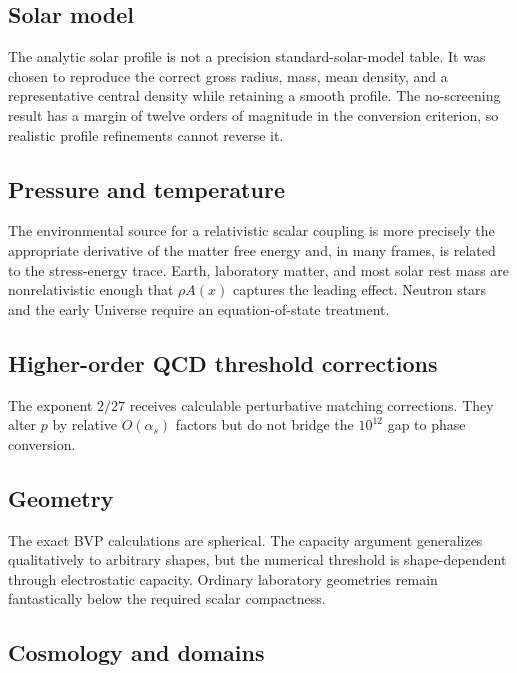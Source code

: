 \documentclass[11pt,a4paper]{article}
\begin{document}
\subsection{Solar model}\label{solar-model}

The analytic solar profile is not a precision standard-solar-model
table. It was chosen to reproduce the correct gross radius, mass, mean
density, and a representative central density while retaining a smooth
profile. The no-screening result has a margin of twelve orders of
magnitude in the conversion criterion, so realistic profile refinements
cannot reverse it.

\subsection{Pressure and
temperature}\label{pressure-and-temperature}

The environmental source for a relativistic scalar coupling is more
precisely the appropriate derivative of the matter free energy and, in
many frames, is related to the stress-energy trace. Earth, laboratory
matter, and most solar rest mass are nonrelativistic enough that
\(\rho A(x)\) captures the leading effect. Neutron stars and the early
Universe require an equation-of-state treatment.

\subsection{Higher-order QCD threshold
corrections}\label{higher-order-qcd-threshold-corrections}

The exponent \(2/27\) receives calculable perturbative matching
corrections. They alter \(p\) by relative \(O(\alpha_s)\) factors but do
not bridge the \(10^{12}\) gap to phase conversion.

\subsection{Geometry}\label{geometry}

The exact BVP calculations are spherical. The capacity argument
generalizes qualitatively to arbitrary shapes, but the numerical
threshold is shape-dependent through electrostatic capacity. Ordinary
laboratory geometries remain fantastically below the required scalar
compactness.

\subsection{Cosmology and domains}\label{cosmology-and-domains}
\end{document}
